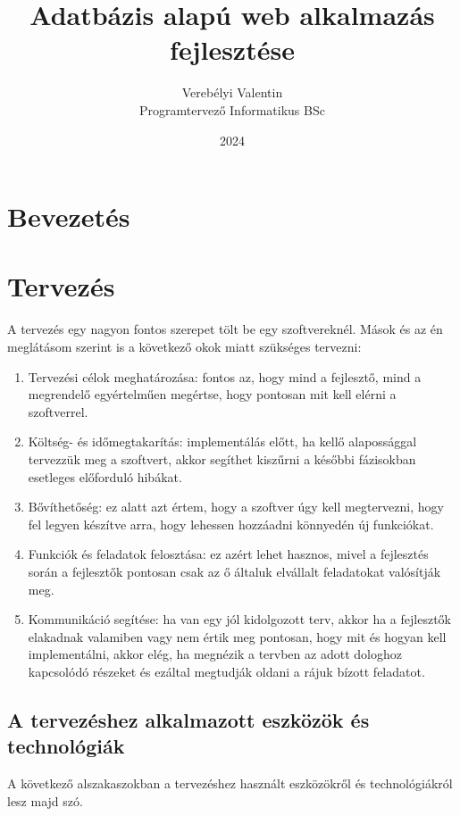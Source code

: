 \documentclass[]{thesis-ekf}
\theoremstyle{definition}
\theoremstyle{remark}
\begin{document}
	\title{Adatbázis alapú web alkalmazás fejlesztése}
	\author{Verebélyi Valentin\\Programtervező Informatikus BSc}
	\date{2024}
	\maketitle
	\tableofcontents
	
	\chapter*{Bevezetés}
	
	\chapter{Tervezés}
		A tervezés egy nagyon fontos szerepet tölt be egy szoftvereknél. Mások és az én meglátásom szerint is a következő okok miatt szükséges tervezni:
		\begin{enumerate}
			\item Tervezési célok meghatározása: fontos az, hogy mind a fejlesztő, mind a megrendelő egyértelműen megértse, hogy pontosan mit kell elérni a szoftverrel.
			\item Költség- és időmegtakarítás: implementálás előtt, ha kellő alapossággal tervezzük meg a szoftvert, akkor segíthet kiszűrni a későbbi fázisokban esetleges előforduló hibákat. 
			\item Bővíthetőség: ez alatt azt értem, hogy a szoftver úgy kell megtervezni, hogy fel legyen készítve arra, hogy lehessen hozzáadni könnyedén új funkciókat.
			\item Funkciók és feladatok felosztása: ez azért lehet hasznos, mivel a fejlesztés során a fejlesztők pontosan csak az ő általuk elvállalt feladatokat valósítják meg.
			\item Kommunikáció segítése: ha van egy jól kidolgozott terv, akkor ha a fejlesztők elakadnak valamiben vagy nem értik meg pontosan, hogy mit és hogyan kell implementálni, akkor elég, ha megnézik a tervben az adott dologhoz kapcsolódó részeket és ezáltal megtudják oldani a rájuk bízott feladatot.
		\end{enumerate}
	\section{A tervezéshez alkalmazott eszközök és technológiák}
		A következő alszakaszokban a tervezéshez használt eszközökről és technológiákról lesz majd szó.
\end{document}
